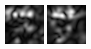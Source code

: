 \begin{figure}[ht]
\begin{center}
 \includegraphics[width=\columnwidth/9]{ch4/figures/mag_0_1.jpg}
 \includegraphics[width=\columnwidth/9]{ch4/figures/mag_0_2.jpg}

\end{center}
\end{figure}
